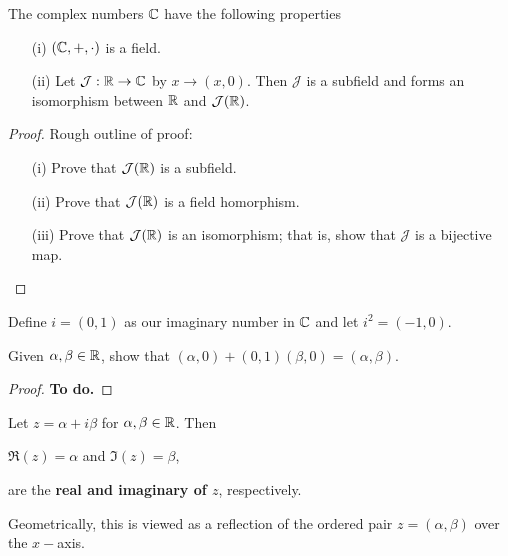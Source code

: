 \documentclass[a4paper]{report}
\begin{document}
\begin{lemma} The complex numbers \( \mathbb{C}  \) have the following properties
    \begin{enumerate}
        \item[(i)] \( (\mathbb{C}, +, \cdot) \) is a field.
        \item[(ii)] Let \( \mathcal{J}: \mathbb{R} \to \mathbb{C}  \) by \( x \to (x,0) \). Then \( \mathcal{J}  \) is a subfield and forms an isomorphism between \( \mathbb{R}  \) and \( \mathcal{J}(\mathbb{R} ) \).
    \end{enumerate}
\end{lemma}

\begin{proof}
Rough outline of proof:
\begin{enumerate}
    \item[(i)] Prove that \( \mathcal{J}(\mathbb{R} ) \) is a subfield.
    \item[(ii)] Prove that \( \mathcal{J}(\mathbb{R}) \) is a field homorphism.
    \item[(iii)] Prove that \( \mathcal{J}(\mathbb{R}) \) is an isomorphism; that is, show that \( \mathcal{J} \) is a bijective map.
\end{enumerate}
\end{proof}

\begin{definition}[Constructing a solution for \( x^2 + 1 = 0  \)]
   Define \( i = (0,1) \) as our imaginary number in \( \mathbb{C}  \) and let \( i^{2} = (-1,0) \). 
\end{definition}


\begin{prop}
    Given \( \alpha, \beta \in \mathbb{R}  \), show that \( (\alpha, 0 ) + (0,1)(\beta, 0) = (\alpha, \beta) \). 
\end{prop}
\begin{proof}
\textbf{To do.}
\end{proof}

\begin{definition}
   Let \( z = \alpha + i \beta  \) for \( \alpha, \beta \in \mathbb{R}  \). Then  
   \begin{center}
       \( \Re(z) = \alpha  \) and \( \Im(z) = \beta   \),
   \end{center}
   are the \textbf{real and imaginary of \( z  \)}, respectively.
\end{definition}

Geometrically, this is viewed as a reflection of the ordered pair \( z = (\alpha, \beta)  \) over the \( x- \)axis.
\end{document}
